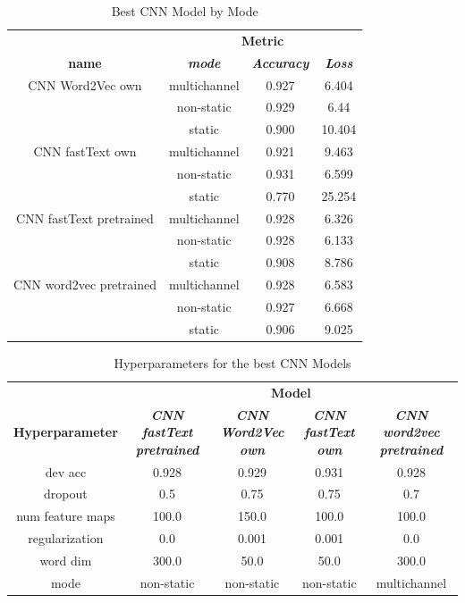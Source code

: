 \documentclass[conference]{IEEEtran}
\begin{document}
\begin{table}[htbp]
\caption{Best CNN Model by Mode}
\begin{center}
\begin{tabular}{|c|c|c|c|}
\hline
\textbf{}&\multicolumn{3}{|c|}{\textbf{Metric}} \\ 
\cline{2-4}
\textbf{name} & \textbf{\textit{mode}}& \textbf{\textit{Accuracy}}& \textbf{\textit{Loss}} \\ 
\hline
CNN Word2Vec own & multichannel & 0.927 & 6.404 \\ 
\cline{2-4}
 & non-static & 0.929 & 6.44 \\ 
\cline{2-4}
 & static & 0.900 & 10.404 \\ 
\hline
CNN fastText own & multichannel & 0.921 & 9.463 \\ 
\cline{2-4}
 & non-static & 0.931 & 6.599 \\ 
\cline{2-4}
& static & 0.770 & 25.254 \\ 
\hline
CNN fastText pretrained & multichannel & 0.928 & 6.326 \\ 
\cline{2-4}
 & non-static & 0.928 & 6.133 \\ 
\cline{2-4}
 & static & 0.908 & 8.786 \\ 
\hline
CNN word2vec pretrained & multichannel & 0.928 & 6.583 \\ 
\cline{2-4}
& non-static & 0.927 & 6.668 \\ 
\cline{2-4}
& static & 0.906 & 9.025 \\ 
\hline
\end{tabular}
\label{taba1}
\end{center}
\end{table}

\begin{table}[htbp]
\caption{Hyperparameters for the best CNN Models}
\begin{center}
\begin{tabular}{|c|c|c|c|c|}
\hline
\textbf{}&\multicolumn{4}{|c|}{\textbf{Model}} \\ 
\cline{2-5}
\textbf{Hyperparameter} & \textbf{\textit{CNN fastText pretrained}}& \textbf{\textit{CNN Word2Vec own}}& \textbf{\textit{CNN fastText own}}& \textbf{\textit{CNN word2vec pretrained}} \\ 
\hline
dev acc & 0.928 & 0.929 & 0.931 & 0.928 \\ 
\hline
dropout & 0.5 & 0.75 & 0.75 & 0.7 \\ 
\hline
num feature maps & 100.0 & 150.0 & 100.0 & 100.0 \\ 
\hline
regularization & 0.0 & 0.001 & 0.001 & 0.0 \\ 
\hline
word dim & 300.0 & 50.0 & 50.0 & 300.0 \\ 
\hline
mode & non-static & non-static & non-static & multichannel \\ 
\hline
\end{tabular}
\label{taba4}
\end{center}
\end{table}
\end{document}
